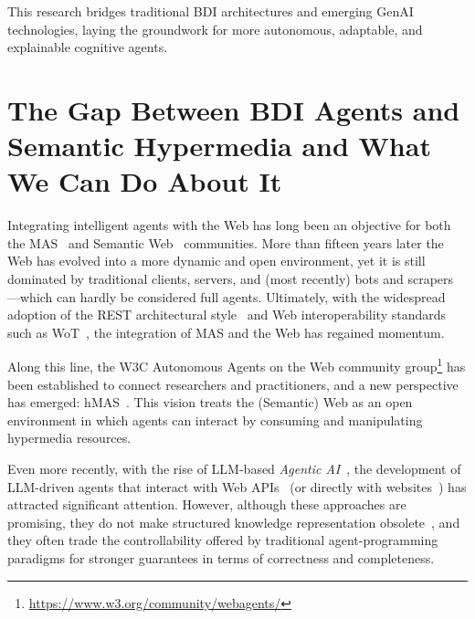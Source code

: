 This research bridges traditional \ac{BDI} architectures and emerging \ac{GenAI} technologies,
laying the groundwork for more autonomous, adaptable, and explainable cognitive agents.

\chapter{The Gap Between BDI Agents and Semantic Hypermedia and What We Can Do About It}
\label{chap:hypermedia}

Integrating intelligent agents with the Web has long been an objective
for both the \ac{MAS}~\cite{DBLP:conf/edoc/ShafiqDF06}
and Semantic Web~\cite{lassila2001semantic} communities.
%
More than fifteen years later
the Web has evolved into a more dynamic and open environment,
yet it is still dominated by traditional clients, servers,
and (most recently) bots and scrapers%
---which can hardly be considered full agents.
%
Ultimately,
with the widespread adoption of the \ac{REST} architectural style~\cite{DBLP:journals/toit/FieldingT02}
and Web interoperability standards such as \ac{WoT}~\cite{wotarch},
the integration of \ac{MAS} and the Web has regained momentum.

Along this line,
the \ac{W3C} Autonomous Agents on the Web community group\footnote{\url{https://www.w3.org/community/webagents/}}
has been established to connect researchers and practitioners,
and a new perspective has emerged: \ac{hMAS}~\cite{DBLP:conf/atal/CiorteaMGBRZ19}.
This vision treats the (Semantic) Web as an open environment in which
agents can interact by consuming and manipulating hypermedia resources.

Even more recently,
with the rise of \ac{LLM}-based \emph{Agentic AI}~\cite{acharya2025access},
the development of \ac{LLM}-driven agents that interact with Web APIs~\cite{10.5555/3692070.3692540}
(or directly with websites~\cite{10.5555/3692070.3694608})
has attracted significant attention.
%
However,
although these approaches are promising,
they do not make structured knowledge representation obsolete~\cite{pan2024tkde},
and they often trade the controllability offered by traditional agent-programming paradigms
for stronger guarantees in terms of correctness and completeness.

